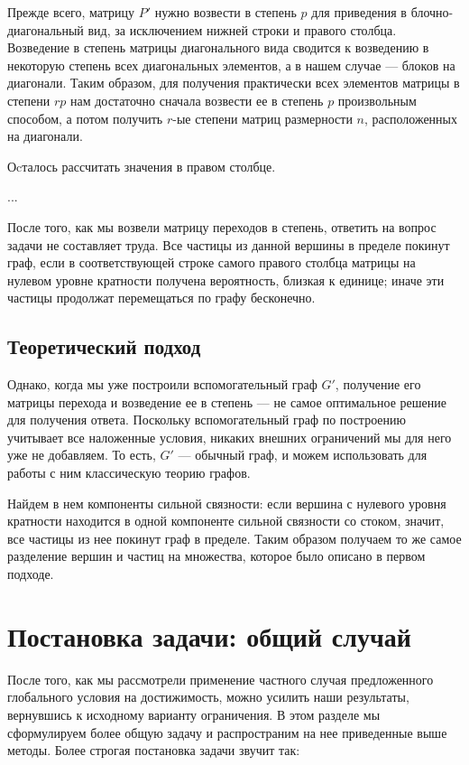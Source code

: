 	Прежде всего, матрицу $P'$ нужно возвести в степень $p$ для приведения в блочно-диагональный вид, за исключением нижней строки и правого столбца. Возведение в степень матрицы диагонального вида сводится к возведению в некоторую степень всех диагональных элементов, а в нашем случае --- блоков на диагонали. Таким образом, для получения практически всех элементов матрицы в степени $rp$ нам достаточно сначала возвести ее в степень $p$ произвольным способом, а потом получить $r$-ые степени матриц размерности $n$, расположенных на диагонали. 
	
	Оcталось рассчитать значения в правом столбце. 
	
	...
	
	После того, как мы возвели матрицу переходов в степень, ответить на вопрос задачи не составляет труда. Все частицы из данной вершины в пределе покинут граф, если в соответствующей строке самого правого столбца матрицы на нулевом уровне кратности получена вероятность, близкая к единице; иначе эти частицы продолжат перемещаться по графу бесконечно. 
	
	\subsection{Теоретический подход}
	
	Однако, когда мы уже построили вспомогательный граф $G'$, получение его матрицы перехода и возведение ее в степень --- не самое оптимальное решение для получения ответа. Поскольку вспомогательный граф по построению учитывает все наложенные условия, никаких внешних ограничений мы для него уже не добавляем. То есть, $G'$ --- обычный граф, и можем использовать для работы с ним классическую теорию графов. 
	
	Найдем в нем компоненты сильной связности: если вершина с нулевого уровня кратности находится в одной компоненте сильной связности со стоком, значит, все частицы из нее покинут граф в пределе. Таким образом получаем то же самое разделение вершин и частиц на множества, которое было описано в первом подходе.  
	
	\section{Постановка задачи: общий случай}
	
	После того, как мы рассмотрели применение частного случая предложенного глобального условия на достижимость, можно усилить наши результаты, вернувшись к исходному варианту ограничения. В этом разделе мы сформулируем более общую задачу и распространим на нее приведенные выше методы. Более строгая постановка задачи звучит так: 	
	
